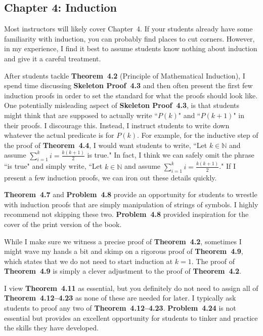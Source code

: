 \documentclass[11pt]{article}%
\newcommand{\blankline}{\pagebreak[2]\vspace{.5\baselineskip}}
\begin{document}
\subsection*{Chapter 4: Induction}

Most instructors will likely cover Chapter~4.  If your students already have some familiarity with induction, you can probably find places to cut corners.  However, in my experience, I find it best to assume students know nothing about induction and give it a careful treatment.  

\blankline

After students tackle \textbf{Theorem~4.2} (Principle of Mathematical Induction), I spend time discussing \textbf{Skeleton Proof~4.3} and then often present the first few induction proofs in order to set the standard for what the proofs should look like. One potentially misleading aspect of \textbf{Skeleton Proof~4.3}, is that students might think that are supposed to actually write ``$P(k)$" and ``$P(k+1)$" in their proofs.  I discourage this.  Instead, I instruct students to write down whatever the actual predicate is for $P(k)$.  For example, for the inductive step of the proof of \textbf{Theorem~4.4}, I would want students to write, ``Let $k\in\mathbb{N}$ and assume $\sum_{i=1}^k i=\frac{k(k+1)}{2}$ is true." In fact, I think we can safely omit the phrase ``is true" and simply write, ``Let $k\in\mathbb{N}$ and assume $\sum_{i=1}^k i=\frac{k(k+1)}{2}$."  If I present a few induction proofs, we can iron out these details quickly.

\blankline

\textbf{Theorem~4.7} and \textbf{Problem~4.8} provide an opportunity for students to wrestle with induction proofs that are simply manipulation of strings of symbols.  I highly recommend not skipping these two. \textbf{Problem~4.8} provided inspiration for the cover of the print version of the book.

\blankline

While I make sure we witness a precise proof of \textbf{Theorem~4.2}, sometimes I might wave my hands a bit and skimp on a rigorous proof of \textbf{Theorem~4.9}, which states that we do not need to start induction at $k=1$.  The proof of \textbf{Theorem~4.9} is simply a clever adjustment to the proof of \textbf{Theorem~4.2}.  

\blankline

I view \textbf{Theorem~4.11} as essential, but you definitely do not need to assign all of \textbf{Theorem~4.12--4.23} as none of these are needed for later.  I typically ask students to proof any two of \textbf{Theorem~4.12--4.23}.  \textbf{Problem~4.24} is not essential but provides an excellent opportunity for students to tinker and practice the skills they have developed.
\end{document}

